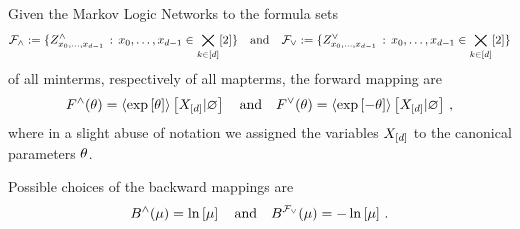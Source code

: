 \begin{theorem}
	Given the Markov Logic Networks to the formula sets
		\[ \mathcal{F}_{\land} := \{ Z^{\land}_{{x_{0},\ldots,x_{d-1}}} \, : \, {x_{0},\ldots,x_{d-1}}\in\bigtimes_{k\in[d]}[2]\} \quad \text{and} \quad 
		\mathcal{F}_{\lor} := \{ Z^{\lor}_{{x_{0},\ldots,x_{d-1}}} \, : \, {x_{0},\ldots,x_{d-1}}\in\bigtimes_{k\in[d]}[2]\}  \]
	of all minterms, respectively of all mapterms, the forward mapping are
		\[ F^{\land}(\theta) = \left\langle \mathrm{exp}\left[\theta\right]\right\rangle \left[ X_{[d]} | \varnothing \right]  
		\quad \text{and} \quad 
		 F^{\lor}(\theta) = \left\langle \mathrm{exp}\left[-\theta\right]\right\rangle \left[ X_{[d]} | \varnothing \right] \, , \]
	where in a slight abuse of notation we assigned the variables $X_{[d]}$ to the canonical parameters $\theta$.

	Possible choices of the backward mappings are
		\[ B^{\land}(\mu) = \ln \left[ \mu \right] 
			\quad \text{and} \quad 
			B^{\mathcal{F}_{\lor}}(\mu) = -\ln \left[ \mu \right] \, .
		 \]
	
\end{theorem}
